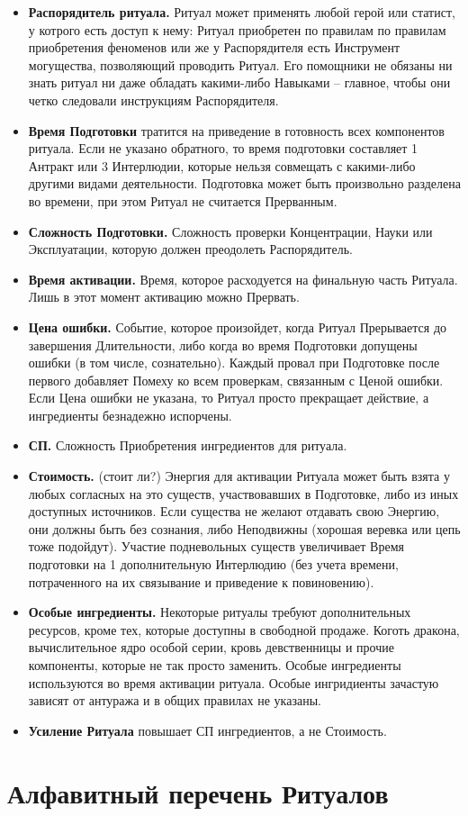 \begin{itemize}
  \item \textbf{Распорядитель ритуала.} Ритуал может применять любой герой или статист, у котрого есть доступ к нему: Ритуал приобретен по правилам по правилам приобретения феноменов или же у Распорядителя есть Инструмент могущества, позволяющий проводить Ритуал. Его помощники не обязаны ни знать ритуал ни даже обладать какими-либо Навыками – главное, чтобы они четко следовали инструкциям Распорядителя.
  \item \textbf{Время Подготовки} тратится на приведение в готовность всех компонентов ритуала. Если не указано обратного, то время подготовки составляет 1 Антракт или 3 Интерлюдии, которые нельзя совмещать с какими-либо другими видами деятельности. 
    \newline Подготовка может быть произвольно разделена во времени, при этом Ритуал не считается Прерванным.
  \item \textbf{Сложность Подготовки.} Сложность проверки Концентрации, Науки или Эксплуатации, которую должен преодолеть Распорядитель.
  \item \textbf{Время активации.} Время, которое расходуется на финальную часть Ритуала. Лишь в этот момент активацию можно Прервать. 
  \item \textbf{Цена ошибки.} Событие, которое произойдет, когда Ритуал Прерывается до завершения Длительности, либо когда во время Подготовки допущены ошибки (в том числе, сознательно). Каждый провал при Подготовке после первого добавляет Помеху ко всем проверкам, связанным с Ценой ошибки.
    Если Цена ошибки не указана, то Ритуал просто прекращает действие, а ингредиенты безнадежно испорчены. 
  \item \textbf{СП.} Сложность Приобретения ингредиентов для ритуала.
  \item \textbf{Стоимость.} \tbd(стоит ли?) Энергия для активации Ритуала может быть взята у любых согласных на это существ, участвовавших в Подготовке, либо из иных доступных источников. 
    \newline Если существа не желают отдавать свою Энергию, они должны быть без сознания, либо Неподвижны (хорошая веревка или цепь тоже подойдут). Участие подневольных существ увеличивает Время подготовки на 1 дополнительную Интерлюдию (без учета времени, потраченного на их связывание и приведение к повиновению).
  \item \textbf{Особые ингредиенты.} \tbd Некоторые ритуалы требуют дополнительных ресурсов, кроме тех, которые доступны в свободной продаже. Коготь дракона, вычислительное ядро особой серии, кровь девственницы и прочие компоненты, которые не так просто заменить.
    \newline Особые ингредиенты используются во время активации ритуала.
    \newline Особые ингридиенты зачастую зависят от антуража и в общих правилах не указаны.
  \item \textbf{Усиление Ритуала} повышает СП ингредиентов, а не Стоимость.
\end{itemize}

\section{Алфавитный перечень Ритуалов}
